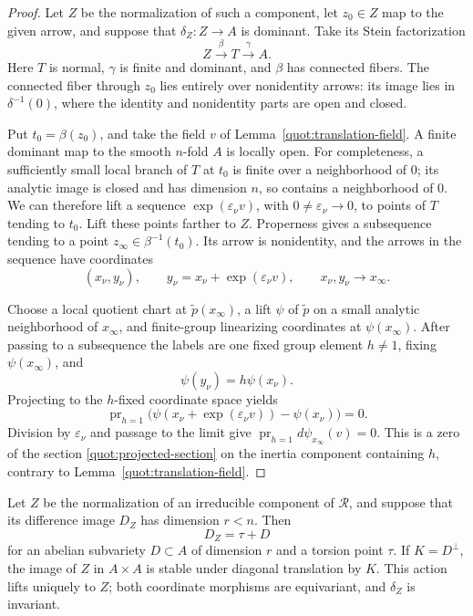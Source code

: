 \begin{proof}
Let \(Z\) be the normalization of such a component, let \(z_0\in Z\)
map to the given arrow, and suppose that \(\delta_Z:Z\to A\) is
dominant.  Take its Stein factorization
\[
                       Z\xrightarrow{\beta}T\xrightarrow{\gamma}A.
\]
Here \(T\) is normal, \(\gamma\) is finite and dominant, and \(\beta\) has connected
fibers.  The connected fiber through \(z_0\) lies entirely over
nonidentity arrows: its image lies in \(\delta^{-1}(0)\), where the
identity and nonidentity parts are open and closed.

Put \(t_0=\beta(z_0)\), and take the field \(v\) of
Lemma~\ref{quot:translation-field}.
A finite dominant map to the smooth \(n\)-fold \(A\) is locally open.
For completeness, a sufficiently small local branch of \(T\) at
\(t_0\) is finite over a neighborhood of \(0\); its analytic image is
closed and has dimension \(n\), so contains a neighborhood of \(0\).
We can therefore lift a sequence
\(\exp(\varepsilon_\nu v)\), with
\(0\ne\varepsilon_\nu\to0\), to points of \(T\) tending to \(t_0\).
Lift these points farther to \(Z\).
Properness gives a subsequence tending to a point
\(z_\infty\in\beta^{-1}(t_0)\).
Its arrow is nonidentity, and the arrows in the sequence have
coordinates
\[
                  (x_\nu,y_\nu),\qquad
                  y_\nu=x_\nu+\exp(\varepsilon_\nu v),
             \qquad x_\nu,y_\nu\longrightarrow x_\infty .
\]

Choose a local quotient chart at \(\widetilde p(x_\infty)\), a lift
\(\psi\) of \(\widetilde p\) on a small analytic neighborhood of
\(x_\infty\), and finite-group linearizing coordinates at
\(\psi(x_\infty)\).
After passing to a subsequence the labels are one fixed group element
\(h\ne1\), fixing \(\psi(x_\infty)\), and
\[
                               \psi(y_\nu)=h\psi(x_\nu).
\]
Projecting to the \(h\)-fixed coordinate space yields
\[
        \operatorname{pr}_{h=1}
                \bigl(\psi(x_\nu+\exp(\varepsilon_\nu v))-\psi(x_\nu)\bigr)
                                                        =0.
\]
Division by \(\varepsilon_\nu\) and passage to the limit give
\(\operatorname{pr}_{h=1}d\psi_{x_\infty}(v)=0\).
This is a zero of the section \eqref{quot:projected-section} on the
inertia component containing \(h\), contrary to
Lemma~\ref{quot:translation-field}.
\end{proof}

\begin{lemma}
\label{quot:difference-image}
Let \(Z\) be the normalization of an irreducible component of
\(\mathcal R\), and suppose that its difference image \(D_Z\) has
dimension \(r<n\).
Then
\[
                              D_Z=\tau+D
\]
for an abelian subvariety \(D\subset A\) of dimension \(r\) and a
torsion point \(\tau\).
If \(K=D^\perp\), the image of \(Z\) in \(A\times A\) is stable under
diagonal translation by \(K\).  This action lifts uniquely to \(Z\);
both coordinate morphisms are equivariant, and \(\delta_Z\) is
invariant.
\end{lemma}

